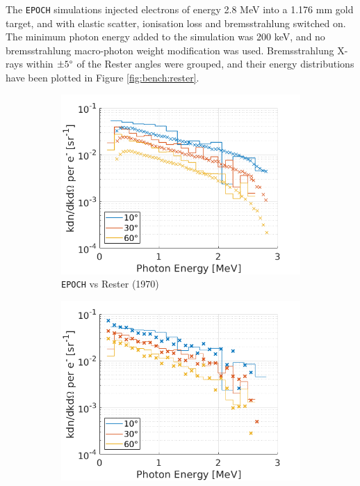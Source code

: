 \documentclass[12pt]{article}
\numberwithin{equation}{section}
\begin{document}
The \texttt{EPOCH} simulations injected electrons of energy 2.8 MeV into a 1.176 mm gold target, and with elastic scatter, ionisation loss and bremsstrahlung switched on. The minimum photon energy added to the simulation was 200 keV, and no bremsstrahlung macro-photon weight modification was used. Bremsstrahlung X-rays within $\pm 5 \degree$ of the Rester angles were grouped, and their energy distributions have been plotted in Figure \ref{fig:bench:rester}.

\begin{figure}
\centering
\begin{subfigure}{.49\textwidth}
  \centering
  \includegraphics[width=1\linewidth]{Figures/bench_Rester.png}
  \caption{\texttt{EPOCH} vs Rester (1970)}
\end{subfigure}%
\begin{subfigure}{.49\textwidth}
  \centering
  \includegraphics[width=1\linewidth]{Figures/bench_Rester_G4.png}

\end{subfigure}
\end{figure}
\end{document}
